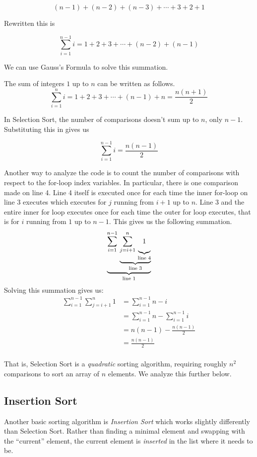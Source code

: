 $$(n-1) + (n-2) + (n-3) + \cdots + 3 + 2 + 1$$

Rewritten this is 

$$\sum_{i=1}^{n-1} i = 1 + 2 + 3 + \cdots + (n-2) + (n-1)$$

We can use Gauss's Formula to solve this summation.

\begin{theorem}
The sum of integers $1$ up to $n$ can be written as follows.
$$\sum_{i=1}^{n} i = 1 + 2 + 3 + \cdots + (n-1) + n = \frac{n(n+1)}{2}$$
\end{theorem}

In Selection Sort, the number of comparisons doesn't sum up to $n$, 
only $n-1$.  Substituting this in gives us 

$$\sum_{i=1}^{n-1} i = \frac{n(n-1)}{2}$$

Another way to analyze the code is to count the number of comparisons
with respect to the for-loop index variables.  In particular, there
is one comparison made on line 4.  Line 4 itself is executed once
for each time the inner for-loop on line 3 executes which executes 
for $j$ running from $i+1$ up to $n$.  Line 3 and the entire inner
for loop executes once for each time the outer for loop executes, 
that is for $i$ running from $1$ up to $n-1$. This gives us the 
following summation.
  $$\underbrace{\sum_{i=1}^{n-1} \, \underbrace{\sum_{j=i+1}^{n} \, \underbrace{
  \vphantom{\left(\frac{a^{0.3}}{b}\right)}
1}_{\textrm{line 4}}}_{\textrm{line 3}}}_{\textrm{line 1}}$$
Solving this summation gives us:
\begin{align*}
  \sum_{i=1}^{n-1} \sum_{j=i+1}^{n} 1 & = \sum_{i=1}^{n-1} n-i \\
  ~ & = \sum_{i=1}^{n-1} n - \sum_{i=1}^{n-1} i \\
  ~ & = n(n-1) - \frac{n(n-1)}{2}\\
  ~ & = \frac{n(n-1)}{2}\\
\end{align*}

That is, Selection Sort is a \emph{quadratic} sorting algorithm, 
requiring roughly $n^2$ comparisons to sort an array of $n$ elements.
We analyze this further below.

\subsection{Insertion Sort}

Another basic sorting algorithm is \emph{Insertion Sort} which works 
slightly differently than Selection Sort.  Rather than finding a minimal
element and swapping with the ``current'' element, the current element
is \emph{inserted} in the list where it needs to be.


